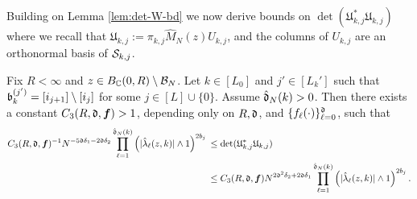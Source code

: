 \documentclass{amsart}
\numberwithin{equation}{section}
\def\corEE{\textcolor{amethyst}}
\def\corEE{}
\def\corAB{}
\begin{document}
 Building on Lemma \ref{lem:det-W-bd} we now derive bounds on $\det(\mathfrak{U}_{k,j}^* \mathfrak{U}_{k,j})$ where we recall that $\mathfrak{U}_{k,j}:=\pi_{k,j} \hat{M}_N(z) U_{k,j}$, and the columns of $U_{k,j}$ \corEE{are} an orthonormal basis of $\mathcal{S}_{k,j}$.

\begin{lemma}\label{lem:sing-prod-ubd}
Fix $R<\infty$ and $z \in B_{\mathbb{C}}(0,R) \setminus \mathcal{B}_N$. Let $k \in [L_0]$ and $j' \in [L_k']$ such that $\mathfrak{b}_k^{(j')}= [i_{j+1}] \setminus [i_j]$ for some $j \in [L] \cup\{0\}$. Assume $\hat{\mathfrak{d}}_N(k) >0$. Then there exists a constant $C_3(R,\mathfrak{d}, {\bm f})>1$, depending only on $R, \mathfrak{d}$, and $\{f_\ell(\cdot)\}_{\ell=0}^{\mathfrak{d}}$, such that %
\begin{align}\label{eq:det-lbd}
C_3(R,\gd, {\bm f})^{-1}
N^{\corEE{-5\gd \delta_1 -2\gd \delta_2}}
\prod_{\ell=1}^{\hat\gd_N(k)} \left(|\hat{\lambda}_\ell(z,k)| \wedge 1\right)^{2b_j}
& \,
\le \det(\corAB{\mathfrak{U}_{k,j}^* \mathfrak{U}_{k,j}}) \notag\\
& \, \le C_3(R,\gd, {\bm f})
N^{\corEE{2\gd^2 \delta_2+2\gd \delta_1}}
\prod_{\ell=1}^{\hat\gd_N(k)} \left(|\hat{\lambda}_\ell(z,k)|\wedge 1 \right)^{2b_j}.
\end{align}
\end{lemma}
\end{document}
